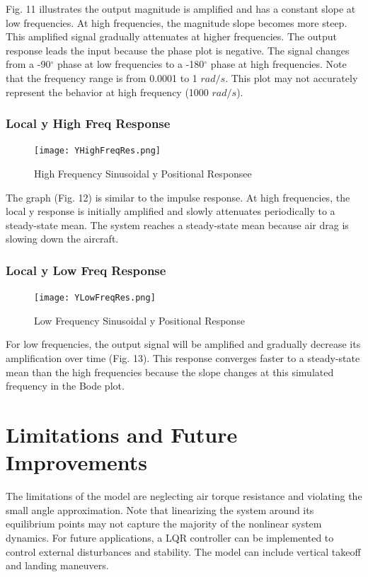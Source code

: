 \documentclass[conference]{IEEEtran}
\begin{document}
Fig. 11 illustrates the output magnitude is amplified and has a constant slope at low frequencies. At high frequencies, the magnitude slope becomes more steep. This amplified signal gradually attenuates at higher frequencies. The output response leads the input because the phase plot is negative. The signal changes from a -90$^{\circ}$ phase at low frequencies to a -180$^{\circ}$ phase at high frequencies.
Note that the frequency range is from 0.0001 to 1 $rad/s$. This plot may not accurately represent the behavior at high frequency (1000 $rad/s$).
\subsubsection{Local y High Freq Response} 
\begin{figure}[htbp]
\centering
\centerline{\texttt{[image: YHighFreqRes.png]}}
\caption{High Frequency Sinusoidal y Positional Responsee}
\label{figure}
\end{figure}

The graph (Fig. 12) is similar to the impulse response. At high frequencies, the local y response is initially amplified and slowly attenuates periodically to a steady-state mean. The system reaches a steady-state mean because air drag is slowing down the aircraft. \\

\newpage
\subsubsection{Local y Low Freq Response} 
\begin{figure}[htbp]
\centerline{\texttt{[image: YLowFreqRes.png]}}
\caption{Low Frequency Sinusoidal y Positional Response}
\label{figure}
\end{figure}

For low frequencies, the output signal will be amplified and gradually decrease its amplification over time (Fig. 13). This response converges faster to a steady-state mean than the high frequencies because the slope changes at this simulated frequency in the Bode plot. \\


\section{Limitations and Future Improvements}
The limitations of the model are neglecting air torque resistance and violating the small angle approximation. Note that linearizing the system around its equilibrium points may not capture the majority of the nonlinear system dynamics. For future applications, a LQR controller can be implemented to control external disturbances and stability. The model can include vertical takeoff and landing maneuvers.
\end{document}
